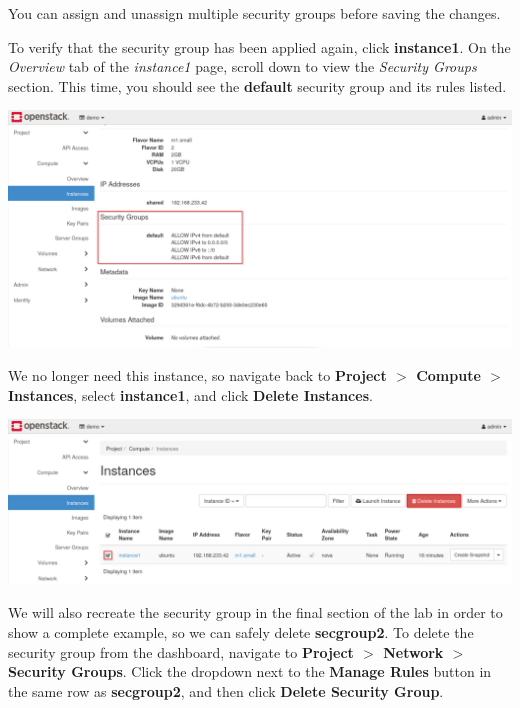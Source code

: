 \documentclass[letterpaper, 12pt]{article}
\begin{document}
\begin{enumerate}
    \begin{tipbox}
        You can assign and unassign multiple security groups before saving the changes.
    \end{tipbox}

    \begin{labstep}
        To verify that the security group has been applied again, click \textbf{instance1}.
        On the \textit{Overview} tab of the \textit{instance1} page, scroll down to view the \textit{Security Groups} section.
        This time, you should see the \textbf{default} security group and its rules listed.

        \begin{center}
            \includegraphics[width=\linewidth]{images/part6/step21.png}
        \end{center}
    \end{labstep}

    \begin{labstep}
        We no longer need this instance, so navigate back to \textbf{Project $>$ Compute $>$ Instances}, select \textbf{instance1}, and click \textbf{Delete Instances}.

        \begin{center}
            \includegraphics[width=\linewidth]{images/part6/step22.png}
        \end{center}
    \end{labstep}

    \begin{labstep}
        We will also recreate the security group in the final section of the lab in order to show a complete example, so we can safely delete \textbf{secgroup2}.
        To delete the security group from the dashboard, navigate to \textbf{Project $>$ Network $>$ Security Groups}.
        Click the dropdown next to the \textbf{Manage Rules} button in the same row as \textbf{secgroup2}, and then click \textbf{Delete Security Group}.


\end{labstep}
\end{enumerate}
\end{document}
